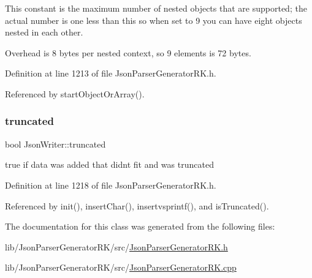 This constant is the maximum number of nested objects that are supported; the actual number is one less than this so when set to 9 you can have eight objects nested in each other.

Overhead is 8 bytes per nested context, so 9 elements is 72 bytes. 

Definition at line 1213 of file Json\+Parser\+Generator\+R\+K.\+h.



Referenced by start\+Object\+Or\+Array().

\mbox{\label{class_json_writer_a30b9462bee5d300841630e64b660fe43}} 
\subsubsection{\texorpdfstring{truncated}{truncated}}
{\footnotesize\ttfamily bool Json\+Writer\+::truncated\hspace{0.3cm}{\ttfamily [protected]}}



true if data was added that didn\textquotesingle{}t fit and was truncated 



Definition at line 1218 of file Json\+Parser\+Generator\+R\+K.\+h.



Referenced by init(), insert\+Char(), insertvsprintf(), and is\+Truncated().



The documentation for this class was generated from the following files\+:\begin{DoxyCompactItemize}
\item 
lib/\+Json\+Parser\+Generator\+R\+K/src/\hyperlink{_json_parser_generator_r_k_8h}{Json\+Parser\+Generator\+R\+K.\+h}\item 
lib/\+Json\+Parser\+Generator\+R\+K/src/\hyperlink{_json_parser_generator_r_k_8cpp}{Json\+Parser\+Generator\+R\+K.\+cpp}\end{DoxyCompactItemize}
